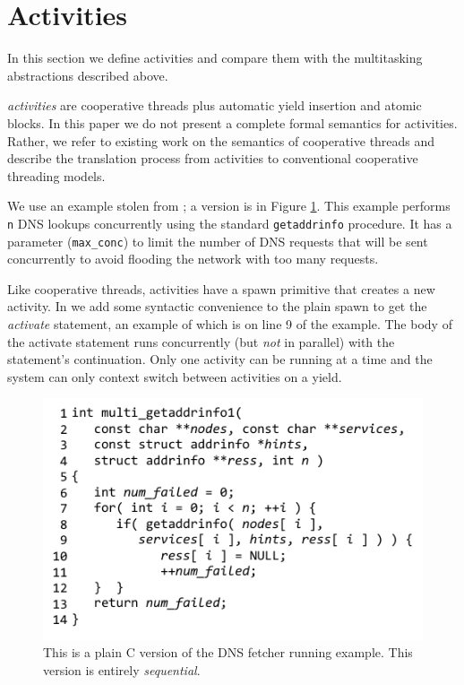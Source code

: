 \documentclass[9pt,preprint]{sigplanconf}
\begin{document}


\section{Activities}

In this section we define activities and compare them with the multitasking abstractions described above.

\emph{activities} are cooperative threads plus automatic yield insertion and atomic blocks.
In this paper we do not present a complete formal semantics for activities.
Rather, we refer to existing work on the semantics of cooperative threads \cite{Abadi2009} and describe the translation process from activities to conventional cooperative threading models.

We use an example stolen from \cite{Krohn2007}; a \charcoal{} version is in Figure \ref{fig:charcoal_multidns_seq}.
This example performs \texttt{n} DNS lookups concurrently using the standard \texttt{getaddrinfo} procedure.
It has a parameter (\texttt{max\_conc}) to limit the number of DNS requests that will be sent concurrently to avoid flooding the network with too many requests.

Like cooperative threads, activities have a spawn primitive that creates a new activity.
In \charcoal{} we add some syntactic convenience to the plain spawn to get the \emph{activate} statement, an example of which is on line 9 of the example.
The body of the activate statement runs concurrently (but \emph{not} in parallel) with the statement's continuation.
Only one activity can be running at a time and the system can only context switch between activities on a yield.

\begin{figure}
\includegraphics{multi_getaddrinfo_seq}
\caption{This is a plain C version of the DNS fetcher running example.
  This version is entirely \emph{sequential}.}
\label{fig:charcoal_multidns_seq}
\end{figure}
\end{document}
